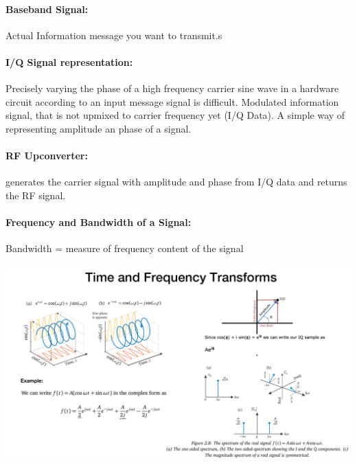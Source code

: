 \paragraph{Baseband Signal:} Actual Information message you want to transmit.s

\paragraph{I/Q Signal representation:} Precisely varying the phase of a high frequency carrier sine wave in a hardware circuit according to an input message signal is difficult. Modulated information signal, that is not upmixed to carrier frequency yet (I/Q Data). A simple way of representing amplitude an phase of a signal.

\paragraph{RF Upconverter:} generates the carrier signal with amplitude and phase from I/Q data and returns the RF signal.

\paragraph{Frequency and Bandwidth of a Signal:} Bandwidth = measure of frequency content of the signal\\
\begin{minipage}{\linewidth}
    \centering      
    \def\svgwidth{\columnwidth}
    
\end{minipage}

\begin{minipage}{\linewidth}
    \centering      
    \includegraphics[width=\linewidth]{Figures/L1_frequency_transforms.PNG}
\end{minipage}

